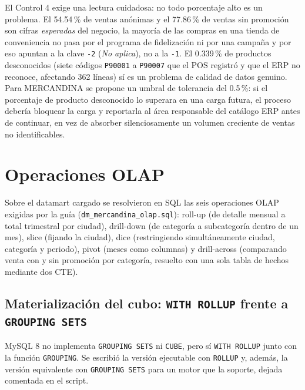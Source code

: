 \documentclass[11pt,a4paper]{article}
\begin{document}
El Control 4 exige una lectura cuidadosa: no todo porcentaje alto es un problema. El 54.54\,\% de ventas anónimas y el 77.86\,\% de ventas sin promoción son cifras \emph{esperadas} del negocio, la mayoría de las compras en una tienda de conveniencia no pasa por el programa de fidelización ni por una campaña y por eso apuntan a la clave \texttt{-2} (\emph{No aplica}), no a la \texttt{-1}. El 0.339\,\% de productos desconocidos (siete códigos \texttt{P90001} a \texttt{P90007} que el POS registró y que el ERP no reconoce, afectando 362 líneas) sí es un problema de calidad de datos genuino. Para MERCANDINA se propone un umbral de tolerancia del 0.5\,\%: si el porcentaje de producto desconocido lo superara en una carga futura, el proceso debería bloquear la carga y reportarla al área responsable del catálogo ERP antes de continuar, en vez de absorber silenciosamente un volumen creciente de ventas no identificables.

\section{Operaciones OLAP}

Sobre el datamart cargado se resolvieron en SQL las seis operaciones OLAP exigidas por la guía (\texttt{dm\_mercandina\_olap.sql}): roll-up (de detalle mensual a total trimestral por ciudad), drill-down (de categoría a subcategoría dentro de un mes), slice (fijando la ciudad), dice (restringiendo simultáneamente ciudad, categoría y periodo), pivot (meses como columnas) y drill-across (comparando venta con y sin promoción por categoría, resuelto con una sola tabla de hechos mediante dos CTE).

\subsection{Materialización del cubo: \texttt{WITH ROLLUP} frente a \texttt{GROUPING SETS}}

MySQL 8 no implementa \texttt{GROUPING SETS} ni \texttt{CUBE}, pero sí \texttt{WITH ROLLUP} junto con la función \texttt{GROUPING}. Se escribió la versión ejecutable con \texttt{ROLLUP} y, además, la versión equivalente con \texttt{GROUPING SETS} para un motor que la soporte, dejada comentada en el script.
\end{document}
